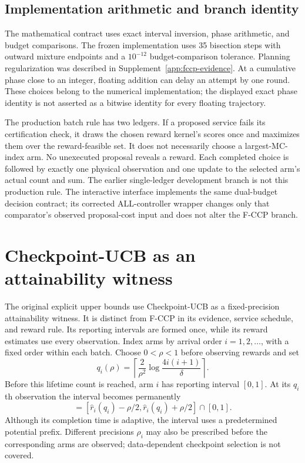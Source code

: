 \documentclass[11pt]{article}
\theoremstyle{remark}
\begin{document}
\subsection{Implementation arithmetic and branch identity}
The mathematical contract uses exact interval inversion, phase
arithmetic, and budget comparisons. The frozen implementation uses
35 bisection steps with outward mixture endpoints and a $10^{-12}$
budget-comparison tolerance. Planning regularization was described in
Supplement~\ref{app:fccp-evidence}. At a cumulative phase close to an
integer, floating addition can delay an attempt by one round. These
choices belong to the numerical implementation; the displayed exact
phase identity is not asserted as a bitwise identity for every floating
trajectory.

The production batch rule has two ledgers. If a proposed service fails
its certification check, it draws the chosen reward kernel's scores
once and maximizes them over the reward-feasible set. It does not
necessarily choose a largest-MC-index arm. No unexecuted proposal
reveals a reward. Each completed choice is followed by exactly one
physical observation and one update to the selected arm's actual
count and sum. The earlier single-ledger development branch is not
this production rule. The interactive interface implements the same
dual-budget decision contract; its corrected ALL-controller wrapper
changes only that comparator's observed proposal-cost input and does
not alter the F-CCP branch.
\section{Checkpoint-UCB as an attainability witness}
\label{app:checkpoint_construction}

The original explicit upper bounds use Checkpoint-UCB as a fixed-precision
attainability witness. It is distinct from F-CCP in its evidence, service
schedule, and reward rule. Its
reporting intervals are formed once, while its reward estimates use every
observation. Index arms by arrival order $i=1,2,\ldots$, with a fixed order
within each batch. Choose $0<\rho<1$ before observing rewards and set
\begin{equation}
 q_i(\rho)=\left\lceil\frac2{\rho^2}
                  \log\frac{4i(i+1)}\delta\right\rceil.
 \label{eq:checkpoint}
\end{equation}
Before this lifetime count is reached, arm $i$ has reporting interval $[0,1]$.
At its $q_i$th observation the interval becomes permanently
\begin{equation}
 [\ell_i,u_i]=[\hat r_i(q_i)-\rho/2,
                 \hat r_i(q_i)+\rho/2]\cap[0,1].
 \label{eq:fixed_interval}
\end{equation}
Although its completion time is adaptive, the
interval uses a predetermined potential prefix. Different precisions
$\rho_i$ may also be prescribed before the corresponding arms are observed;
data-dependent checkpoint selection is not covered.
\end{document}
